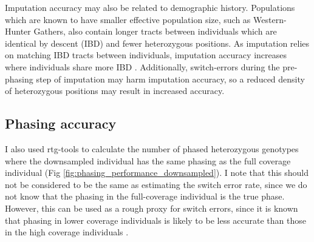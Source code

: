 Imputation accuracy may also be related to demographic history. Populations which are known to have smaller effective population size, such as Western-Hunter Gathers, also contain longer tracts between individuals which are identical by descent (IBD) \cite{browning2015accurate} and fewer heterozygous positions. As imputation relies on matching IBD tracts between individuals, imputation accuracy increases where individuals share more IBD \cite{kong2008detection}. Additionally, switch-errors during the pre-phasing step of imputation may harm imputation accuracy, so a reduced density of heterozygous positions may result in increased accuracy. 

\subsection{Phasing accuracy}

I also used rtg-tools to calculate the number of phased heterozygous genotypes where the downsampled individual has the same phasing as the full coverage individual (Fig \ref{fig:phasing_performance_downsampled}). I note that this should not be considered to be the same as estimating the switch error rate, since we do not know that the phasing in the full-coverage individual is the true phase. However, this can be used as a rough proxy for switch errors, since it is known that phasing in lower coverage individuals is likely to be less accurate than those in the high coverage individuals \cite{rubinacci2021efficient}.

